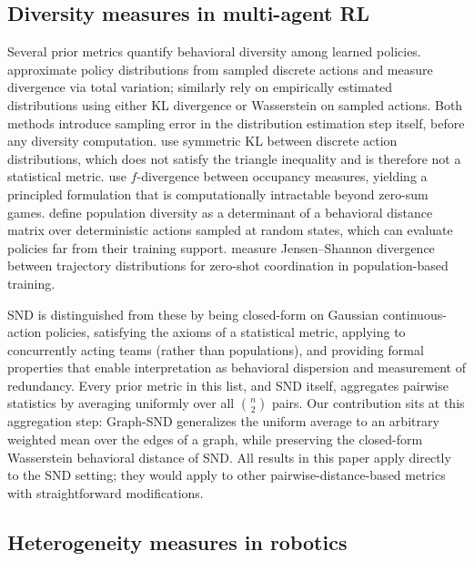 \documentclass[11pt]{article}
\theoremstyle{plain}
\theoremstyle{definition}
\theoremstyle{remark}
\begin{document}
\subsection{Diversity measures in multi-agent RL}

Several prior metrics quantify behavioral diversity among learned
policies. \citet{mckee2022diversity} approximate policy distributions
from sampled discrete actions and measure divergence via total
variation; \citet{yu2021informative} similarly rely on empirically
estimated distributions using either KL divergence or Wasserstein on
sampled actions. Both methods introduce sampling error in the
distribution estimation step itself, before any diversity computation.
\citet{hu2022policy} use symmetric KL between discrete action
distributions, which does not satisfy the triangle inequality and is
therefore not a statistical metric. \citet{liu2021unifying} use
$f$-divergence between occupancy measures, yielding a principled
formulation that is computationally intractable beyond zero-sum games.
\citet{parker-holder2020effective} define population diversity as a
determinant of a behavioral distance matrix over deterministic actions
sampled at random states, which can evaluate policies far from their
training support. \citet{lupu2021trajedi} measure Jensen--Shannon
divergence between trajectory distributions for zero-shot coordination
in population-based training.

SND \citep{bettini2025snd} is distinguished from these by being
closed-form on Gaussian continuous-action policies, satisfying the
axioms of a statistical metric, applying to concurrently acting
teams (rather than populations), and providing formal properties that
enable interpretation as behavioral dispersion and measurement of
redundancy. Every prior metric in this list, and SND itself,
aggregates pairwise statistics by averaging uniformly over all
$\binom{n}{2}$ pairs. Our contribution sits at this aggregation step:
Graph-SND generalizes the uniform average to an arbitrary weighted
mean over the edges of a graph, while preserving the closed-form
Wasserstein behavioral distance of SND. All results in this paper
apply directly to the SND setting; they would apply to other
pairwise-distance-based metrics with straightforward modifications.

\subsection{Heterogeneity measures in robotics}
\end{document}
